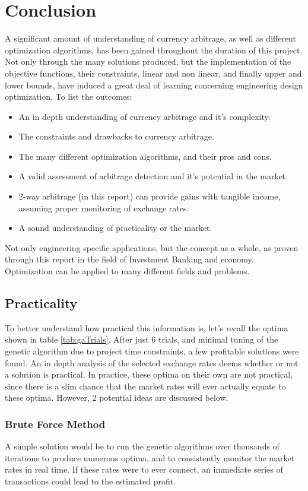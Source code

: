 \documentclass[12pt]{article}
\begin{document}
\section{Conclusion}
A significant amount of understanding of currency arbitrage, as well as different optimization algorithms, has been gained throughout the duration of this project. Not only through the many solutions produced, but the implementation of the objective functions, their constraints, linear and non linear, and finally upper and lower bounds, have induced a great deal of learning concerning engineering design optimization.  To list the outcomes:
\begin{itemize}
	\item An in depth understanding of currency arbitrage and it's complexity.
	\item The constraints and drawbacks to currency arbitrage.
	\item The many different optimization algorithms, and their pros and cons.
	\item A valid assessment of arbitrage detection and it's potential in the market.
	\item 2-way arbitrage (in this report) can provide gains with tangible income, assuming proper monitoring of exchange rates.
	\item A sound understanding of practicality or the market.
\end{itemize}
Not only engineering specific applications, but the concept as a whole, as proven through this report in the field of Investment Banking and economy. Optimization can be applied to many different fields and problems.
\subsection{Practicality}
\label{prac}
To better understand how practical this information is, let's recall the optima shown in table \ref{tab:gaTrials}. After just 6 trials, and minimal tuning of the genetic algorithm due to project time constraints, a few profitable solutions were found. An in depth analysis of the selected exchange rates deems whether or not a solution is practical. In practice, these optima on their own are not practical, since there is a slim chance that the market rates will ever actually equate to these optima. However, 2 potential ideas are discussed below.
\subsubsection{Brute Force Method}
A simple solution would be to run the genetic algorithms over thousands of iterations to produce numerous optima, and to consistently monitor the market rates in real time. If these rates were to ever connect, an immediate series of transactions could lead to the estimated profit.
\end{document}
